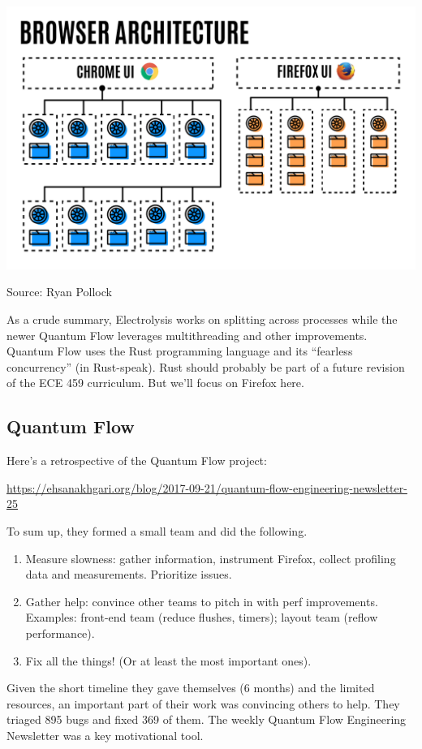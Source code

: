 \documentclass[a4paper]{report}
\begin{document}
\begin{center}
\includegraphics[width=.9\textwidth]{images/L19-chrome-vs-firefox.png}
\end{center}
Source: Ryan Pollock~\cite{goldilocks}

As a crude summary, Electrolysis works on splitting across processes
while the newer Quantum Flow leverages multithreading and other
improvements.  Quantum Flow uses the Rust programming language and its
``fearless concurrency'' (in Rust-speak). Rust should probably be part
of a future revision of the ECE 459 curriculum. But we'll focus on
Firefox here.

\subsection*{Quantum Flow}
Here's a retrospective of the Quantum Flow project:
\begin{center}
\url{https://ehsanakhgari.org/blog/2017-09-21/quantum-flow-engineering-newsletter-25}
\end{center}

To sum up, they formed a small team and did the following.
\begin{enumerate}[noitemsep]
\item Measure slowness: gather information, instrument Firefox, collect profiling data and measurements. Prioritize issues.
\item Gather help: convince other teams to pitch in with perf improvements. Examples: front-end team (reduce flushes, timers); layout team (reflow performance).
\item Fix all the things! (Or at least the most important ones).
\end{enumerate}
Given the short timeline they gave themselves (6 months) and the limited resources, an important part of their work was convincing others to help.
They triaged 895 bugs and fixed 369 of them. The weekly Quantum Flow Engineering Newsletter was a key motivational tool.
\end{document}
